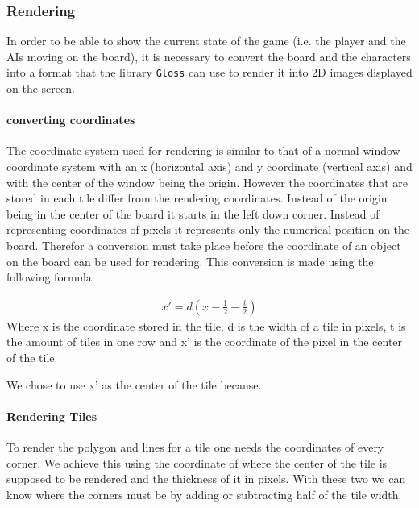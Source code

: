 \documentclass{article}
\begin{document}
    	\subsubsection{Rendering}
        In order to be able to show the current state of the game (i.e. the player and the AIs moving on the board), it is necessary to convert the board and the characters into a format that the library \texttt{Gloss} can use to render it into 2D images displayed on the screen. \\

        \paragraph{converting coordinates}

        The coordinate system used for rendering is similar to that of a normal window coordinate system with an x (horizontal axis) and y coordinate (vertical axis) and with the center of the window being the origin. However the coordinates that are stored in each tile differ from the rendering coordinates. Instead of the origin being in the center of the board it starts in the left down corner. Instead of representing coordinates of pixels it represents only the numerical position on the board. Therefor  a conversion must take place before the coordinate of an object on the board can be used for rendering.
\newline
This conversion is made using the following formula:

\begin{eqnarray}
	x' = d(x - \frac{1}{2} - \frac{t}{2})
\end{eqnarray}
	Where x is the coordinate stored in the tile, d is the width of a tile in pixels, t is the amount of tiles in one row and x' is the coordinate of the pixel in the center of the tile.

	We chose to use x' as the center of the tile because.  \\
\paragraph{Rendering Tiles}
	To render the polygon and lines for a tile one needs the coordinates of every corner. We achieve this using the coordinate of where the center of the tile is supposed to be rendered and the thickness of it in pixels. With these two we can know where the corners must be by adding or subtracting half of the tile width. \\
\end{document}
